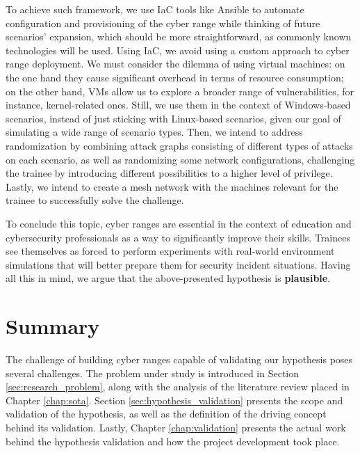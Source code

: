 To achieve such framework, we use IaC tools like Ansible to automate configuration and provisioning of the cyber range while thinking of future scenarios' expansion, which should be more straightforward, as commonly known technologies will be used. Using IaC, we avoid using a custom approach to cyber range deployment. We must consider the dilemma of using virtual machines: on the one hand they cause significant overhead in terms of resource consumption; on the other hand, VMs allow us to explore a broader range of vulnerabilities, for instance, kernel-related ones. Still, we use them in the context of Windows-based scenarios, instead of just sticking with Linux-based scenarios, given our goal of simulating a wide range of scenario types. Then, we intend to address randomization by combining attack graphs consisting of different types of attacks on each scenario, as well as randomizing some network configurations, challenging the trainee by introducing different possibilities to a higher level of privilege. Lastly, we intend to create a mesh network with the machines relevant for the trainee to successfully solve the challenge.

To conclude this topic, cyber ranges are essential in the context of education and cybersecurity professionals as a way to significantly improve their skills. Trainees see themselves as forced to perform experiments with real-world environment simulations that will better prepare them for security incident situations. Having all this in mind, we argue that the above-presented hypothesis is \textbf{plausible}.

\section{Summary} \label{sec:problem_summary}

The challenge of building cyber ranges capable of validating our hypothesis poses several challenges. The problem under study is introduced in Section \ref{sec:research_problem}, along with the analysis of the literature review placed in Chapter \ref{chap:sota}. Section \ref{sec:hypothesis_validation} presents the scope and validation of the hypothesis, as well as the definition of the driving concept behind its validation. Lastly, Chapter \ref{chap:validation} presents the actual work behind the hypothesis validation and how the project development took place.